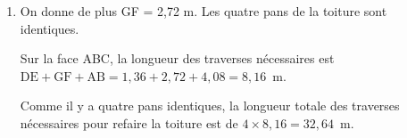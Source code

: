 \begin{enumerate}
\begin{enumerate}
		\item On donne de plus GF = 2,72 m. Les quatre pans de la toiture sont identiques.
		

Sur la face ABC, la longueur des traverses nécessaires est\\
$\text{DE} + \text{GF} + \text{AB} = 1,36 + 2,72 + 4,08 = 8,16$~m.

Comme il y a quatre pans identiques, la longueur totale des traverses nécessaires pour refaire la toiture est de $4\times 8,16 = 32,64$~m.
	\end{enumerate} 
\end{enumerate}
